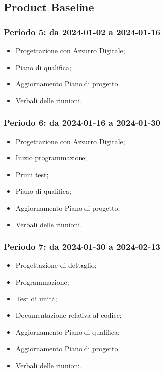 \documentclass[10pt, a4paper]{article}
\begin{document}
{{{{{{{{\subsection{Product Baseline}

\subsubsection{Periodo 5: da 2024-01-02 a 2024-01-16}
\begin{itemize}
    \item Progettazione con Azzurro Digitale;
    \item Piano di qualifica;
    \item Aggiornamento Piano di progetto.
    \item Verbali delle riunioni.
\end{itemize}

\subsubsection{Periodo 6: da 2024-01-16 a 2024-01-30}
%
\begin{itemize}
    \item Progettazione con Azzurro Digitale;
    \item Inizio programmazione;
    \item Primi test;
    \item Piano di qualifica;
    \item Aggiornamento Piano di progetto.
    \item Verbali delle riunioni.
\end{itemize}

\subsubsection{Periodo 7: da 2024-01-30 a 2024-02-13}
%
\begin{itemize}
    \item Progettazione di dettaglio;
    \item Programmazione;
    \item Test di unità;
    \item Documentazione relativa al codice;
    \item Aggiornamento Piano di qualifica;
    \item Aggiornamento Piano di progetto.
    \item Verbali delle riunioni.
\end{itemize}

}}}}}}}}
\end{document}
